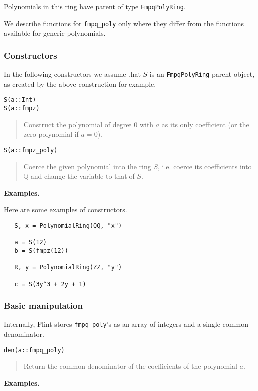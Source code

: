 \documentclass[a4paper,10pt]{article}
\newcommand{\Q}{\mathbb{Q}}
\newcommand{\code}{\lstinline}
\newcommand{\desc}[1]{\vspace{-3mm}\begin{quote}#1\end{quote}}
\begin{document}
{{Polynomials in this ring have parent of type \code{FmpqPolyRing}.

We describe functions for \code{fmpq_poly} only where they differ from the functions
available for generic polynomials.

\subsubsection{Constructors}

In the following constructors we assume that $S$ is an \code{FmpqPolyRing} parent 
object, as created by the above construction for example.

\begin{lstlisting}
S(a::Int)
S(a::fmpz)
\end{lstlisting}

\desc{Construct the polynomial of degree $0$ with $a$ as its only coefficient (or
the zero polynomial if $a = 0$).}

\begin{lstlisting}
S(a::fmpz_poly)
\end{lstlisting}

\desc{Coerce the given polynomial into the ring $S$, i.e. coerce its coefficients
into $\Q$ and change the variable to that of $S$.}

\textbf{Examples.}

Here are some examples of constructors.

\begin{lstlisting}
   S, x = PolynomialRing(QQ, "x")

   a = S(12)
   b = S(fmpz(12))
   
   R, y = PolynomialRing(ZZ, "y")

   c = S(3y^3 + 2y + 1)
\end{lstlisting}

\subsubsection{Basic manipulation}

Internally, Flint stores \code{fmpq_poly}'s as an array of integers and a single
common denominator.

\begin{lstlisting}
den(a::fmpq_poly)
\end{lstlisting}

\desc{Return the common denominator of the coefficients of the polynomial $a$.}

\textbf{Examples.}

}}
\end{document}
